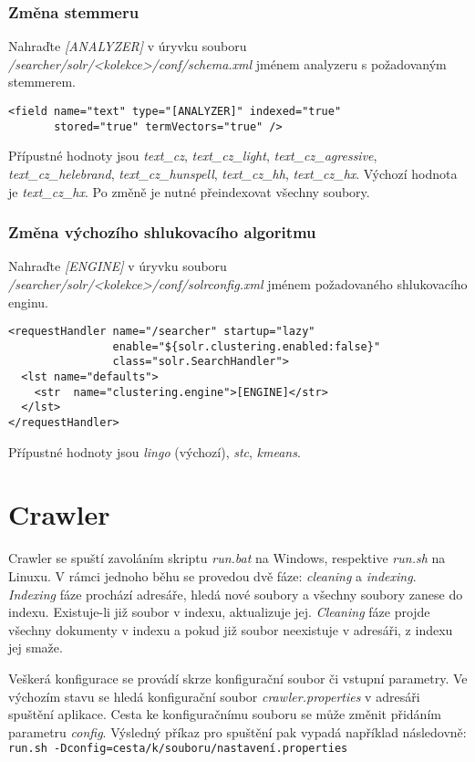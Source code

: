 \subsubsection{Změna stemmeru}
Nahraďte \emph{[ANALYZER]} v úryvku souboru \emph{/searcher/solr/<kolekce>/conf/schema.xml} jménem analyzeru s požadovaným stemmerem.
\begin{verbatim}
<field name="text" type="[ANALYZER]" indexed="true" 
       stored="true" termVectors="true" />
\end{verbatim}
Přípustné hodnoty jsou \emph{text\_cz}, \emph{text\_cz\_light}, \emph{text\_cz\_agressive}, \emph{text\_cz\_helebrand}, \emph{text\_cz\_hunspell}, \emph{text\_cz\_hh}, \emph{text\_cz\_hx}. Výchozí hodnota je \emph{text\_cz\_hx}. Po změně je nutné přeindexovat všechny soubory.

\subsubsection{Změna výchozího shlukovacího algoritmu}
Nahraďte \emph{[ENGINE]} v úryvku souboru \emph{/searcher/solr/<kolekce>/conf/solrconfig.xml} jménem požadovaného shlukovacího enginu.
\begin{verbatim}
<requestHandler name="/searcher" startup="lazy"
                enable="${solr.clustering.enabled:false}"
                class="solr.SearchHandler">
  <lst name="defaults">
    <str  name="clustering.engine">[ENGINE]</str>
  </lst>
</requestHandler>
\end{verbatim}
Přípustné hodnoty jsou \emph{lingo} (výchozí), \emph{stc}, \emph{kmeans}.

\section{Crawler}
Crawler se spuští zavoláním skriptu \emph{run.bat} na Windows, respektive \emph{run.sh} na Linuxu. V rámci jednoho běhu se provedou dvě fáze: \emph{cleaning} a \emph{indexing}. \emph{Indexing} fáze prochází adresáře, hledá nové soubory a všechny soubory zanese do indexu. Existuje-li již soubor v indexu, aktualizuje jej. \emph{Cleaning} fáze projde všechny dokumenty v indexu a pokud již soubor neexistuje v adresáři, z indexu jej smaže. 

Veškerá konfigurace se provádí skrze konfigurační soubor či vstupní parametry. Ve výchozím stavu se hledá konfigurační soubor \emph{crawler.properties} v adresáři spuštění aplikace. Cesta ke konfiguračnímu souboru se může změnit přidáním parametru \emph{config}. Výsledný příkaz pro spuštění pak vypadá například následovně: \\ \verb|run.sh -Dconfig=cesta/k/souboru/nastavení.properties| \\

